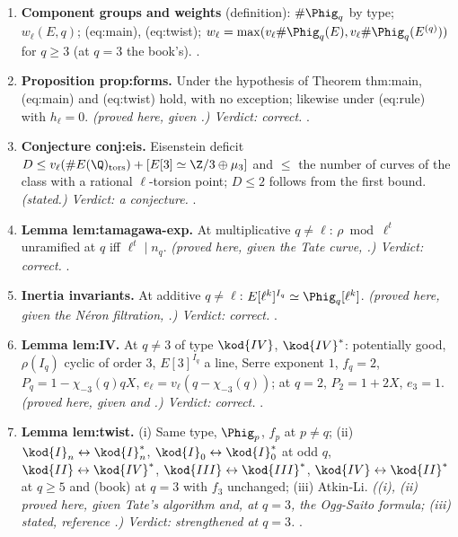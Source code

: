 \begin{sloppypar}
\begin{enumerate}[label=\textbf{\thechapter.\arabic*}]
image $\Ns$. \emph{(stated; the facts on $h_\ell$ proved here.) Verdict: a conjecture; the claims about it are correct.} .
\item \textbf{Component groups and weights} (definition): $\#\Phig_q$ by type; $w_\ell(E,q)$; (eq:main), (eq:twist); $w_\ell=\max(v_\ell\#\Phig_q(E),v_\ell\#\Phig_q(E^{(q)}))$ for $q\ge3$ (at $q=3$ the
book's). .
\item \textbf{Proposition prop:forms.} Under the hypothesis of Theorem thm:main, (eq:main) and (eq:twist) hold, with no exception; likewise under (eq:rule) with $h_\ell=0$. \emph{(proved here,
given .) Verdict: correct.} .
\item \textbf{Conjecture conj:eis.} Eisenstein deficit $D\le v_\ell(\#E(\Q)_{\mathrm{tors}})+[E[3]\simeq\Z/3\oplus\mu_3]$ and $\le$ the number of curves of the class with a rational $\ell$-torsion point;
$D\le2$ follows from the first bound. \emph{(stated.) Verdict: a conjecture.} .
\item \textbf{Lemma lem:tamagawa-exp.} At multiplicative $q\ne\ell$: $\rho\bmod\ell^t$ unramified at $q$ iff $\ell^t\mid n_q$. \emph{(proved here, given the Tate curve, .) Verdict: correct.}
.
\item \textbf{Inertia invariants.} At additive $q\ne\ell$: $E[\ell^k]^{I_q}\simeq\Phig_q[\ell^k]$. \emph{(proved here, given the N\'eron filtration, .) Verdict: correct.} .
\item \textbf{Lemma lem:IV.} At $q\ne3$ of type $\kod{IV}$, $\kod{IV}^*$: potentially good, $\rho(I_q)$ cyclic of order $3$, $E[3]^{I_q}$ a line, Serre exponent $1$, $f_q=2$, $P_q=1-\chi_{-3}(q)qX$, $e_\ell=v_\ell(q-\chi_{-3}(q))$; at
$q=2$, $P_2=1+2X$, $e_3=1$. \emph{(proved here, given \cite{SerreTate68} and .) Verdict: correct.} .
\item \textbf{Lemma lem:twist.} (i) Same type, $\Phig_p$, $f_p$ at $p\ne q$; (ii) $\kod{I}_n\leftrightarrow\kod{I}_n^*$, $\kod{I}_0\leftrightarrow\kod{I}_0^*$ at odd $q$, $\kod{II}\leftrightarrow\kod{IV}^*$, $\kod{III}\leftrightarrow\kod{III}^*$, $\kod{IV}\leftrightarrow\kod{II}^*$ at $q\ge5$ and (book) at
$q=3$ with $f_3$ unchanged; (iii) Atkin-Li. \emph{((i), (ii) proved here, given Tate's algorithm and, at $q=3$, the Ogg-Saito formula; (iii) stated, reference \cite{AtkinLi78}.) Verdict:
strengthened at $q=3$.} .

\end{enumerate}
\end{sloppypar}
